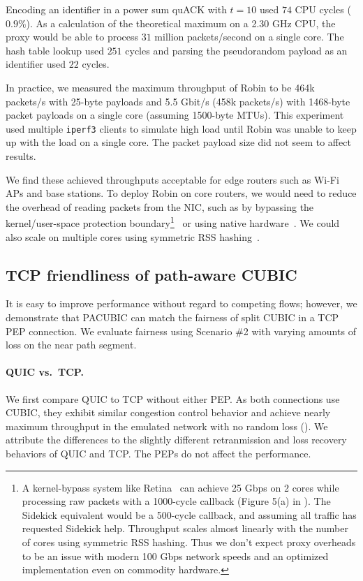Encoding an identifier in a power sum quACK with $t=10$ used $74$ CPU
cycles ($0.9\%$). As a calculation of the theoretical maximum on a 2.30 GHz
CPU, the proxy would be able to process $31$ million packets/second on a single
core. The hash table lookup used $251$ cycles and parsing the pseudorandom
payload as an identifier used $22$ cycles.

In practice, we measured the maximum throughput of Robin to
be 464k packets/s with 25-byte payloads and 5.5 Gbit/s (458k packets/s) with
1468-byte packet payloads on a single core (assuming 1500-byte MTUs).
This experiment used multiple \texttt{iperf3} clients to simulate high
load until Robin was unable to keep up with the load on a single core.
The packet payload size did not seem to affect results.

We find these achieved throughputs acceptable for edge routers such as Wi-Fi
APs and base stations.
To deploy Robin on core routers, we would need to reduce the overhead of reading
packets from the NIC, such as by bypassing the kernel/user-space
protection boundary\footnote{
A kernel-bypass system like Retina~\cite{wan2022retina} can achieve
25 Gbps on 2 cores while processing raw packets with a 1000-cycle callback
(Figure 5(a) in \cite{wan2022retina}). The Sidekick equivalent would be a 500-cycle
callback, and assuming all traffic has requested Sidekick help. Throughput scales
almost linearly with the number of cores using symmetric RSS hashing.
Thus we don't expect proxy overheads to be an issue with modern 100 Gbps network
speeds and an optimized implementation even on commodity hardware.
}~\cite{dpdk,mccanne1993bsd,wan2022retina}
or using native hardware~\cite{bosshart2014p4}.
We could also scale on multiple cores using symmetric RSS hashing~\cite{woo2012scalable}.

\subsection{TCP friendliness of path-aware CUBIC}
\label{sec:sidekick:evaluation:pacubic}



It is easy to improve performance without regard to competing flows;
however, we demonstrate that PACUBIC can
match the fairness of split CUBIC in a TCP PEP connection\@.
We evaluate fairness using Scenario \#2 with varying amounts of loss on the
near path segment.

\paragraph{QUIC vs.\ TCP\@.}
We first compare QUIC to TCP without either PEP\@.
As both connections use CUBIC, they exhibit similar
congestion control behavior and achieve nearly maximum throughput in the
emulated network with no random loss ().
We attribute the differences to the slightly different retranmission and
loss recovery behaviors of QUIC and TCP\@. The PEPs do not affect the
performance.


